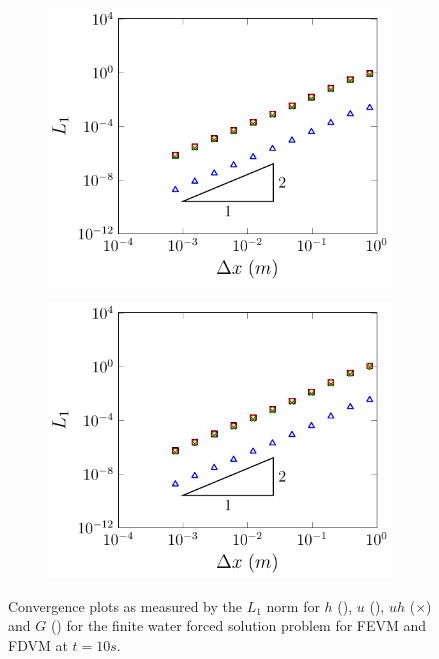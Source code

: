 \begin{figure}
	\centering
	\begin{subfigure}{0.5\textwidth}
		\includegraphics[width=\textwidth]{./chp5/figures/Forced/Wet/FEVML1.pdf}
		\vspace{0.5cm}
	\end{subfigure}%
	\begin{subfigure}{0.5\textwidth}
		\includegraphics[width=\textwidth]{./chp5/figures/Forced/Wet/FDVML1.pdf}
		\vspace{0.5cm}
	\end{subfigure}
	\caption{Convergence plots as measured by the $L_1$ norm for $h$ (), $u$ (),  $uh$ ({\color{green!60!black}$\times$})  and $G$ () for the finite water forced solution problem for FEVM and FDVM at $t=10s$.}
	\label{fig:L1convergenceforcedWet}
\end{figure}


